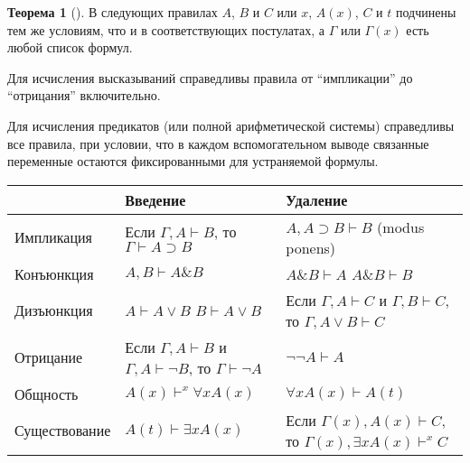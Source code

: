 \documentclass[a4paper, 12pt]{article}  %
\DeclareMathOperator{\conj}{\mathbb{\&}}
\theoremstyle{definition}
\newtheorem{theorem}{Теорема}
\begin{document}
	\begin{theorem}[]
		В следующих правилах $A$, $B$ и $C$ или $x$, $A(x)$, $C$ и $t$ подчинены тем же 
		условиям, что и в соответствующих постулатах, а $\Gamma$ или $\Gamma(x)$ есть 
		любой список формул. 
		
		Для исчисления высказываний справедливы
		правила от ``импликации'' до ``отрицания'' включительно.
		
		Для исчисления предикатов (или полной арифметической системы) справедливы все 
		правила, при условии, что в каждом вспомогательном выводе связанные переменные
		остаются фиксированными для устраняемой формулы.
		
		\begin{center}
			\begin{tabular}{ | m{3cm} | m{5.2cm}| m{5cm} | }
				\hline
							& Введение & Удаление \\ 
				\hline
				Импликация 	& Если $\Gamma, A \vdash B$, \newline то $\Gamma \vdash A 
							\supset B$    
							& $A, A \supset B \vdash B$ \newline (modus ponens) \\
				\hline
				Конъюнкция 	& $A, B \vdash A \conj B$ 
							& $A \conj B \vdash A$ \newline $A \conj B \vdash B$ \\
				\hline
				Дизъюнкция 	& $A \vdash A \vee B$ \newline $B \vdash A \vee B$ 
							& Если $\Gamma, A \vdash C$ и $\Gamma, B \vdash C$, \newline то
							$\Gamma, A \vee B \vdash C$ \\
				\hline
				Отрицание  	& Если $\Gamma, A \vdash B$ и $\Gamma, A \vdash \neg B$, 
							\newline то $\Gamma \vdash \neg A$ 
							& $\neg \neg A \vdash A$ \\
				\hline
				Общность   	& $A(x) \vdash^x \forall x A(x)$ 
							& $\forall x A(x) \vdash A(t)$ \\
				\hline
				Существование & $A(t) \vdash \exists x A(x)$ 
							& Если $\Gamma(x), A(x) \vdash C$, \newline то $\Gamma(x), \exists x A(x) \vdash^x C$ \\
				\hline
			\end{tabular}
		\end{center}  
	\end{theorem}

	\newpage
	
\end{document}
